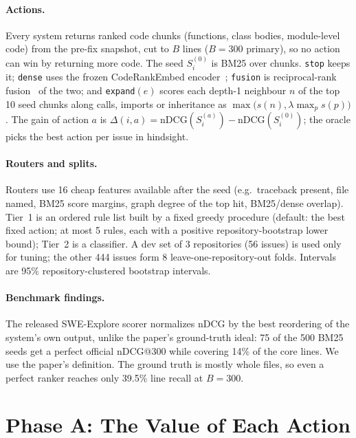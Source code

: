 \documentclass[11pt]{article}
\newcommand{\action}[1]{\texttt{#1}}
\newcommand{\seed}{S_i^{(0)}}
\begin{document}
\paragraph{Actions.} Every system returns ranked code chunks (functions,
class bodies, module-level code) from the pre-fix snapshot, cut to $B$ lines
($B=300$ primary), so no action can win by returning more code. The seed
$\seed$ is BM25 over chunks. \action{stop} keeps it; \action{dense} uses the
frozen CodeRankEmbed encoder~\citep{suresh2025cornstack}; \action{fusion} is
reciprocal-rank fusion~\citep{cormack2009rrf} of the two; and
\action{expand}$(e)$ scores each depth-1 neighbour $n$ of the top 10 seed
chunks along calls, imports or inheritance as
$\max\big(s(n), \lambda \max_p s(p)\big)$. The gain of action $a$ is
$\Delta(i,a) = \mathrm{nDCG}(S_i^{(a)}) - \mathrm{nDCG}(\seed)$; the oracle
picks the best action per issue in hindsight.

\paragraph{Routers and splits.} Routers use 16 cheap features available after
the seed (e.g.\ traceback present, file named, BM25 score margins, graph
degree of the top hit, BM25/dense overlap). Tier~1 is an ordered rule list
built by a fixed greedy procedure (default: the best fixed action; at most 5
rules, each with a positive repository-bootstrap lower bound); Tier~2 is a
classifier. A dev set of 3 repositories (56 issues) is used only for tuning;
the other 444 issues form 8 leave-one-repository-out folds. Intervals are
95\% repository-clustered bootstrap intervals.

\paragraph{Benchmark findings.} The released SWE-Explore scorer normalizes
nDCG by the best reordering of the system's own output, unlike the paper's
ground-truth ideal: 75 of the 500 BM25 seeds get a perfect official nDCG@300
while covering 14\% of the core lines. We use the paper's definition. The
ground truth is mostly whole files, so even a perfect ranker reaches only
39.5\% line recall at $B=300$.

\section{Phase A: The Value of Each Action}
\end{document}
